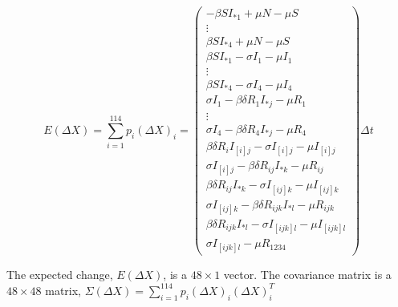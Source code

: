 \documentclass[12pt]{article}
\begin{document}
\begin{equation}
 E(\Delta X)=\sum_{i=1}^{114} p_i (\Delta X)_i=
\begin{pmatrix}
-\beta S I_{*1} + \mu N -\mu S\\
\vdots\\
\beta S I_{*4} + \mu N -\mu S\\
\beta S I_{*1} -\sigma I_1 -\mu I_1\\
\vdots\\
\beta S I_{*4} -\sigma I_4 -\mu I_4\\
\sigma I_1 - \beta \delta R_1 I_{*j} -\mu R_1\\
\vdots\\
\sigma I_4 - \beta \delta R_4 I_{*j} -\mu R_4\\
\beta \delta R_i I_{[i]j} - \sigma I_{[i]j} -\mu I_{[i]j}\\ 
\sigma I_{[i]j} - \beta \delta R_{ij} I_{*k} - \mu R_{ij}\\
\beta \delta R_{ij} I_{*k} -\sigma I_{[ij]k} -\mu I_{[ij]k}\\ 
\sigma I_{[ij]k} - \beta \delta R_{ijk} I_{*l} -\mu R_{ijk}\\
\beta \delta R_{ijk} I_{*l} - \sigma I_{[ijk]l} - \mu I_{[ijk]l} \\
\sigma I_{[ijk]l} - \mu R_{1234}
\end{pmatrix}
 \Delta t
\end{equation}

The expected change, $E(\Delta X)$, is a $48\times 1$ vector. The covariance 
matrix is a $48\times 48$ matrix, $\Sigma(\Delta X)= \sum_{i=1}^{114} p_i 
(\Delta X)_i (\Delta X)_i^T$
%
\end{document}
